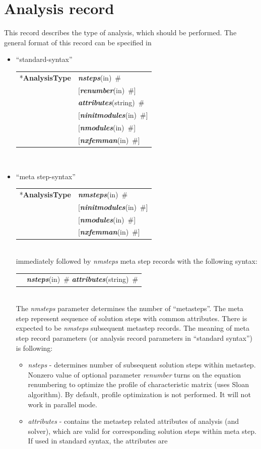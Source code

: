 \documentclass[a4paper]{article}
\makeatletter
\newcommand{\param}[1]{{\em #1}}
\newcommand{\keywordnotype}[1]{\mbox{{\it{\bf{#1}}}}}
\newcommand{\keyword}[2]{\mbox{{\keywordnotype{#1}\tiny (#2)}}}
\newcommand{\entKeyword}[1]{\mbox{{*{\bf{#1}}}}}
\newcommand{\field}[2]{\mbox{\keyword{#1}{#2}~\#}}
\newcommand{\optField}[2]{\mbox{[\field{#1}{#2}]}}
\newenvironment{record}[1][]{\begin{tabular}{|ll}}{\end{tabular}\\}
\newcommand{\recentry}[2]{{#1}&{#2}\\}
\newcounter{rcc}
\newenvironment{record}[1][\textwidth]{\setcounter{rcc}{0}\begin{tabular*}{#1}{|ll@{\extracolsep{\fill}}r}}{\end{tabular*}\\}
\newcommand{\recentry}[2]{\ifthenelse{\value{rcc}>0}{&$\backslash$ \\}{\setcounter{rcc}{1}}{#1}&{#2}}
\makeatother
\begin{document}
\section{Analysis record}
\label{_AnalysisRecord}
This record describes the type of analysis, which should be
performed. The general format of this record can be specified in
\begin{itemize}
\item ``standard-syntax''\\
  \begin{record}[0.9\textwidth]
    \recentry{\entKeyword{AnalysisType}}{\field{nsteps}{in}} \recentry{}{\optField{renumber}{in}}
    \recentry{}{\field{attributes}{string}} \recentry{}{\optField{ninitmodules}{in}} \recentry{}{\optField{nmodules}{in}} \recentry{}{\optField{nxfemman}{in}}
  \end{record}
\item ``meta step-syntax''\\
  \begin{record}[0.9\textwidth]
    \recentry{\entKeyword{AnalysisType}}{\field{nmsteps}{in}}
    \recentry{}{\optField{ninitmodules}{in}} \recentry{}{\optField{nmodules}{in}} \recentry{}{\optField{nxfemman}{in}}
  \end{record}
  immediately followed by \param{nmsteps} meta step records with the following syntax:\\
  \begin{record}[0.9\textwidth]
    \recentry{}{\field{nsteps}{in} \field{attributes}{string}}
  \end{record}
  The \param{nmsteps} parameter determines the number of ``metasteps''. The
meta step represent sequence of solution steps with common attributes.
There is expected to be \param{nmsteps} subsequent metastep records.
The meaning of meta step record parameters (or analysis record
parameters in ``standard syntax'') is following:
\begin{itemize}
\item \param{nsteps} - determines number of subsequent solution steps
within me\-ta\-step.
Nonzero value of optional parameter \param{renumber} turns on the
equation renumbering to optimize the profile of characteristic matrix
(uses Sloan algorithm). By default, profile optimization is not
performed. It will not work in parallel mode.
\item \param{attributes} - contains the metastep related attributes of
analysis (and solver), which are valid for corresponding solution
steps within meta step. If used in standard syntax, the attributes are

\end{itemize}
\end{itemize}
\end{document}
